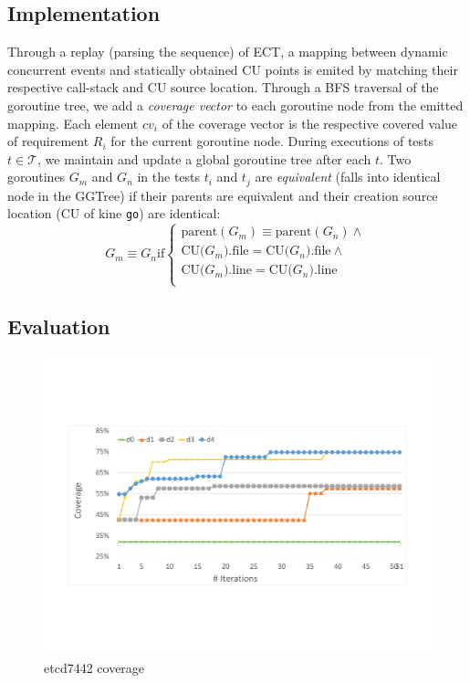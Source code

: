 \subsection{Implementation}
Through a replay (\ie parsing the sequence) of ECT, a mapping between dynamic concurrent events and statically obtained CU points is emited by matching their respective call-stack and CU source location.
%
Through a BFS traversal of the goroutine tree, we add a \textit{coverage vector} to each goroutine node from the emitted mapping. Each element $cv_i$ of the coverage vector is the respective covered value of requirement $R_i$ for the current goroutine node.
%
During executions of tests $t \in \mathcal{T}$, we maintain and update a global goroutine tree after each $t$.
%
Two goroutines $G_m$ and $G_n$ in the tests $t_i$ and $t_j$ are \textit{equivalent} (\ie falls into identical node in the GGTree) if their parents are equivalent and their creation source location (CU of kine \texttt{go}) are identical:
\begin{equation}
  G_m \equiv G_n   \text{if}
  \begin{cases}
    \text{parent}(G_m) \equiv \text{parent}(G_n)  \wedge \\
    \text{CU(}G_m\text{).file} = \text{CU(}G_n\text{).file}  \wedge\\
    \text{CU(}G_m\text{).line} = \text{CU(}G_n\text{).line} \\
  \end{cases}
\end{equation}




\subsection{Evaluation}

\begin{figure}
\centering
  \includegraphics[width=.95\linewidth]{figs/coverage_etcd7443.pdf}
  \caption{etcd7442 coverage}
  \label{fig:etcd_coverage}
\end{figure}


